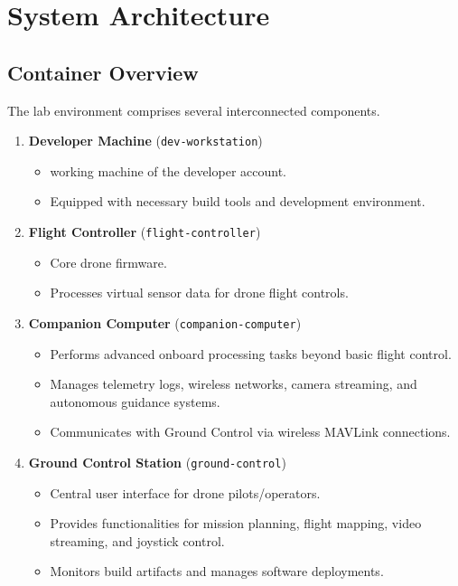 \documentclass[12pt]{scrartcl}
\begin{document}
    \section{System Architecture}

    \subsection{Container Overview}

    The lab environment comprises several interconnected components.

    \begin{enumerate}[itemsep=1 em]

        \item \textbf{Developer Machine} (\texttt{dev-workstation})
        \begin{itemize}
            \item working machine of the developer account.
            \item Equipped with necessary build tools and development environment.
        \end{itemize}

        \item \textbf{Flight Controller} (\texttt{flight-controller})
        \begin{itemize}
            \item Core drone firmware.
            \item Processes virtual sensor data for drone flight controls.
        \end{itemize}

        \item \textbf{Companion Computer} (\texttt{companion-computer})
        \begin{itemize}
            \item Performs advanced onboard processing tasks beyond basic flight control.
            \item Manages telemetry logs, wireless networks, camera streaming, and autonomous guidance systems.
            \item Communicates with Ground Control via wireless MAVLink connections.
        \end{itemize}

        \item \textbf{Ground Control Station} (\texttt{ground-control})
        \begin{itemize}
            \item Central user interface for drone pilots/operators.
            \item Provides functionalities for mission planning, flight mapping, video streaming, and joystick control.
            \item Monitors build artifacts and manages software deployments.
        \end{itemize}


\end{enumerate}
\end{document}
